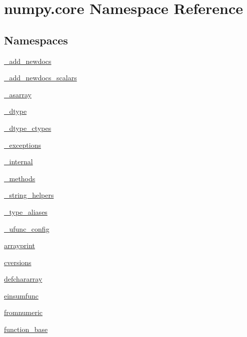 \hypertarget{namespacenumpy_1_1core}{}\section{numpy.\+core Namespace Reference}
\label{namespacenumpy_1_1core}
\subsection*{Namespaces}
\begin{DoxyCompactItemize}
\item 
 \hyperlink{namespacenumpy_1_1core_1_1__add__newdocs}{\+\_\+add\+\_\+newdocs}
\item 
 \hyperlink{namespacenumpy_1_1core_1_1__add__newdocs__scalars}{\+\_\+add\+\_\+newdocs\+\_\+scalars}
\item 
 \hyperlink{namespacenumpy_1_1core_1_1__asarray}{\+\_\+asarray}
\item 
 \hyperlink{namespacenumpy_1_1core_1_1__dtype}{\+\_\+dtype}
\item 
 \hyperlink{namespacenumpy_1_1core_1_1__dtype__ctypes}{\+\_\+dtype\+\_\+ctypes}
\item 
 \hyperlink{namespacenumpy_1_1core_1_1__exceptions}{\+\_\+exceptions}
\item 
 \hyperlink{namespacenumpy_1_1core_1_1__internal}{\+\_\+internal}
\item 
 \hyperlink{namespacenumpy_1_1core_1_1__methods}{\+\_\+methods}
\item 
 \hyperlink{namespacenumpy_1_1core_1_1__string__helpers}{\+\_\+string\+\_\+helpers}
\item 
 \hyperlink{namespacenumpy_1_1core_1_1__type__aliases}{\+\_\+type\+\_\+aliases}
\item 
 \hyperlink{namespacenumpy_1_1core_1_1__ufunc__config}{\+\_\+ufunc\+\_\+config}
\item 
 \hyperlink{namespacenumpy_1_1core_1_1arrayprint}{arrayprint}
\item 
 \hyperlink{namespacenumpy_1_1core_1_1cversions}{cversions}
\item 
 \hyperlink{namespacenumpy_1_1core_1_1defchararray}{defchararray}
\item 
 \hyperlink{namespacenumpy_1_1core_1_1einsumfunc}{einsumfunc}
\item 
 \hyperlink{namespacenumpy_1_1core_1_1fromnumeric}{fromnumeric}
\item 
 \hyperlink{namespacenumpy_1_1core_1_1function__base}{function\+\_\+base}
\item 

\end{DoxyCompactItemize}
